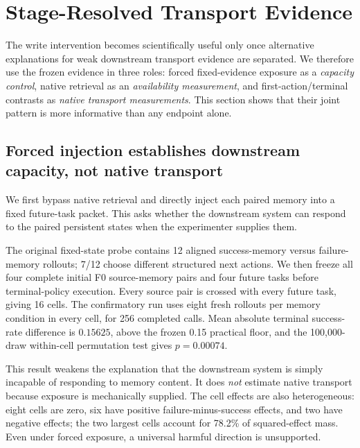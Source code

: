 \section{Stage-Resolved Transport Evidence}
\label{sec:variance}
The write intervention becomes scientifically useful only once alternative explanations for weak downstream transport evidence are separated. We therefore use the frozen evidence in three roles: forced fixed-evidence exposure as a \emph{capacity control}, native retrieval as an \emph{availability measurement}, and first-action/terminal contrasts as \emph{native transport measurements}. This section shows that their joint pattern is more informative than any endpoint alone.

\subsection{Forced injection establishes downstream capacity, not native transport}
We first bypass native retrieval and directly inject each paired memory into a fixed future-task packet. This asks whether the downstream system can respond to the paired persistent states when the experimenter supplies them.

The original fixed-state probe contains 12 aligned success-memory versus failure-memory rollouts; 7/12 choose different structured next actions. We then freeze all four complete initial F0 source-memory pairs and four future tasks before terminal-policy execution. Every source pair is crossed with every future task, giving 16 cells. The confirmatory run uses eight fresh rollouts per memory condition in every cell, for 256 completed calls. Mean absolute terminal success-rate difference is $0.15625$, above the frozen 0.15 practical floor, and the 100,000-draw within-cell permutation test gives $p=0.00074$.

This result weakens the explanation that the downstream system is simply incapable of responding to memory content. It does \emph{not} estimate native transport because exposure is mechanically supplied. The cell effects are also heterogeneous: eight cells are zero, six have positive failure-minus-success effects, and two have negative effects; the two largest cells account for 78.2\% of squared-effect mass. Even under forced exposure, a universal harmful direction is unsupported.

